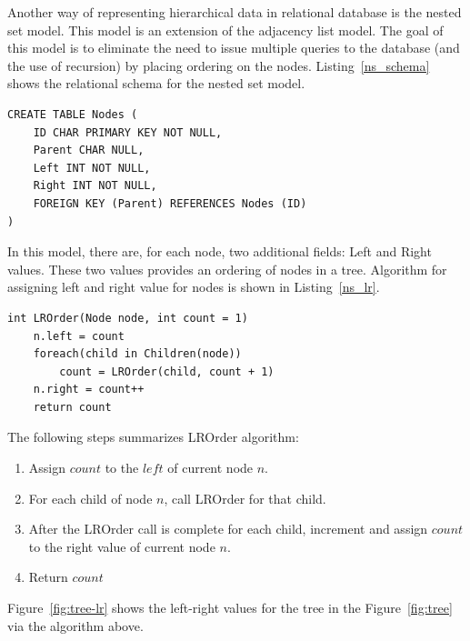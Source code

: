 Another way of representing hierarchical data in relational database is the nested set model\cite{journals/trj/Kamfonas92}. This model is an extension of the adjacency list model. The goal of this model is to eliminate the need to issue multiple queries to the database (and the use of recursion) by placing ordering on the nodes. Listing~\ref{ns_schema} shows the relational schema for the nested set model.

\begin{minipage}{\linewidth}
\begin{lstlisting}[frame=single]
CREATE TABLE Nodes (
    ID CHAR PRIMARY KEY NOT NULL,
    Parent CHAR NULL,
    Left INT NOT NULL,
    Right INT NOT NULL,
    FOREIGN KEY (Parent) REFERENCES Nodes (ID)
)
\end{lstlisting}	
\end{minipage}

In this model, there are, for each node, two additional fields: Left and Right values. These two values provides an ordering of nodes in a tree. Algorithm for assigning left and right value for nodes is shown in Listing~\ref{ns_lr}.

\begin{minipage}{\linewidth}
\begin{lstlisting}[frame=single]
int LROrder(Node node, int count = 1)
	n.left = count
	foreach(child in Children(node))
		count = LROrder(child, count + 1)
	n.right = count++
	return count
\end{lstlisting}	
\end{minipage}

The following steps summarizes LROrder algorithm:

\begin{enumerate}
\item Assign $count$ to the $left$ of current node $n$.
\item For each child of node $n$, call LROrder for that child.
\item After the LROrder call is complete for each child, increment and assign $count$ to the right value of current node $n$.
\item Return $count$
\end{enumerate}

Figure~\ref{fig:tree-lr} shows the left-right values for the tree in the Figure~\ref{fig:tree} via the algorithm above.

